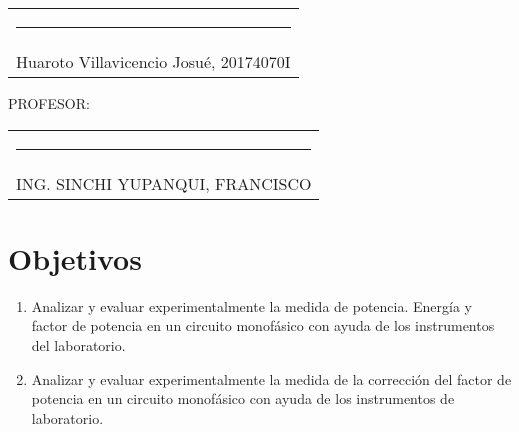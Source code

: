 \documentclass[a4paper,12pt]{report}
\begin{document}
\begin{center}
\begin{tabular}{c}
\rule[1pt]{3.14in}{1pt}\\
Huaroto Villavicencio Josué, 20174070I \\[2.5cm]
\end{tabular}
\end{center}
{\large PROFESOR:} \\[2cm]
\begin{center}
\begin{tabular}{c}
\rule[3pt]{4.8in}{1pt}\\[1pt]
ING. SINCHI YUPANQUI, FRANCISCO 
\end{tabular}
\end{center}
\vfill
\newpage
\tableofcontents
\newpage
{} %
\setcounter{page}{1}  %
\chapter{Objetivos}
\begin{enumerate}
\item Analizar y evaluar experimentalmente la medida de potencia. Energía y factor de potencia en un circuito monofásico con ayuda de los instrumentos del laboratorio.
\item Analizar y evaluar experimentalmente la medida de la corrección del factor de potencia en un circuito monofásico con ayuda de los instrumentos de laboratorio.
\end{enumerate}
\end{document}
